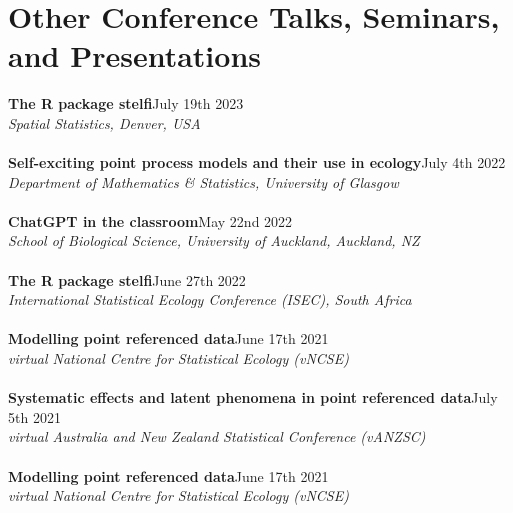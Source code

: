 \documentclass[10pt,letter]{article}
\begin{document}
\section*{Other Conference Talks, Seminars, and Presentations}
\vspace{1mm}
 {\textbf{The R package stelfi}}\hfill July 19th 2023\\
                 {\sl  Spatial Statistics, Denver, USA}\\
                 \hdashrule[0.5ex]{4cm}{1pt}{1pt}\\
{\textbf{Self-exciting point process models and their use in ecology}}\hfill July 4th 2022\\
                 {\sl Department of Mathematics \& Statistics, University of Glasgow}\\
                 \hdashrule[0.5ex]{4cm}{1pt}{1pt}\\
                 {\textbf{ChatGPT in the classroom}}\hfill May 22nd 2022\\
                 {\sl  School of Biological Science, University of Auckland, Auckland, NZ}\\
                 \hdashrule[0.5ex]{4cm}{1pt}{1pt}\\
                 {\textbf{The R package stelfi}}\hfill June 27th 2022\\
                 {\sl  International Statistical Ecology Conference (ISEC), South Africa}\\
                 \hdashrule[0.5ex]{4cm}{1pt}{1pt}\\
                  {\textbf{Modelling point referenced data}}\hfill June 17th 2021\\
                 {\sl virtual National Centre for Statistical Ecology (vNCSE)}\\
                 \hdashrule[0.5ex]{4cm}{1pt}{1pt}\\
 {\textbf{Systematic effects and latent phenomena in point referenced data}}\hfill July 5th 2021\\
                 {\sl virtual Australia and New Zealand Statistical Conference (vANZSC)}\\
                 \hdashrule[0.5ex]{4cm}{1pt}{1pt}\\
                  {\textbf{Modelling point referenced data}}\hfill June 17th 2021\\
                 {\sl virtual National Centre for Statistical Ecology (vNCSE)}\\
                 \hdashrule[0.5ex]{4cm}{1pt}{1pt}\\
\end{document}
